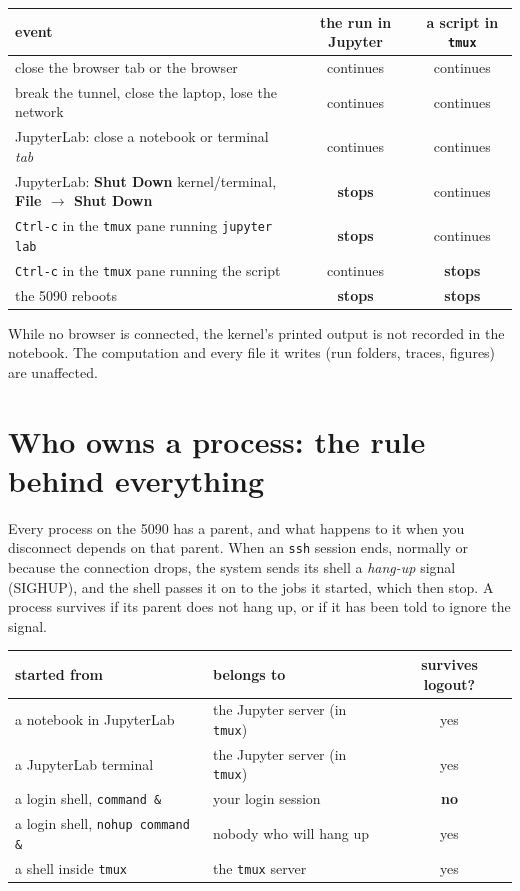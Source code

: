 \documentclass[11pt]{article}
\newcommand{\code}[1]{\texttt{#1}}
\begin{document}
\begin{center}
\small
\begin{tabular}{p{}cc}
\toprule
event & the run in Jupyter & a script in \code{tmux}\\
\midrule
close the browser tab or the browser & continues & continues\\
break the tunnel, close the laptop, lose the network & continues & continues\\
JupyterLab: close a notebook or terminal \emph{tab} & continues & continues\\
JupyterLab: \textbf{Shut Down} kernel/terminal, \textbf{File $\to$ Shut Down} & \textbf{stops} & continues\\
\code{Ctrl-c} in the \code{tmux} pane running \code{jupyter lab} & \textbf{stops} & continues\\
\code{Ctrl-c} in the \code{tmux} pane running the script & continues & \textbf{stops}\\
the 5090 reboots & \textbf{stops} & \textbf{stops}\\
\bottomrule
\end{tabular}
\end{center}

\noindent While no browser is connected, the kernel's printed output is not recorded in
the notebook. The computation and every file it writes (run folders, traces, figures) are
unaffected.


\section{Who owns a process: the rule behind everything}
\label{sec:owner}

Every process on the 5090 has a parent, and what happens to it when you disconnect depends
on that parent. When an \code{ssh} session ends, normally or because the connection drops,
the system sends its shell a \emph{hang-up} signal (SIGHUP), and the shell passes it on to
the jobs it started, which then stop. A process survives if its parent does not hang up, or
if it has been told to ignore the signal.

\begin{center}
\small
\begin{tabular}{p{}p{}c}
\toprule
started from & belongs to & survives logout?\\
\midrule
a notebook in JupyterLab & the Jupyter server (in \code{tmux}) & yes\\
a JupyterLab terminal & the Jupyter server (in \code{tmux}) & yes\\
a login shell, \code{command \&} & your login session & \textbf{no}\\
a login shell, \code{nohup command \&} & nobody who will hang up & yes\\
a shell inside \code{tmux} & the \code{tmux} server & yes\\
\bottomrule
\end{tabular}
\end{center}
\end{document}
